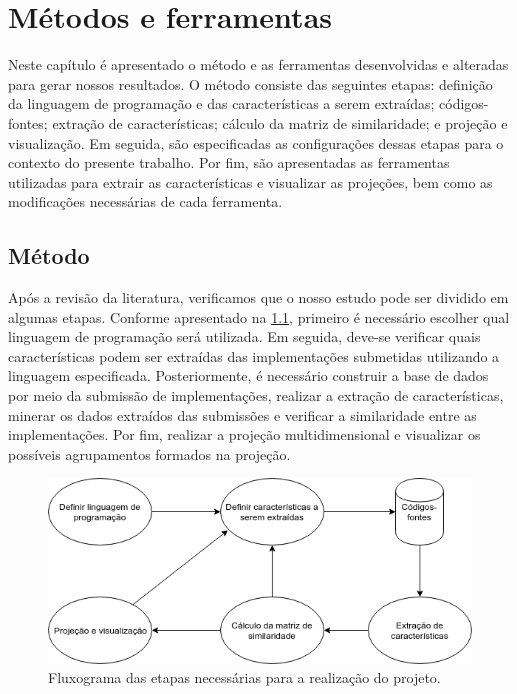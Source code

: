 \chapter{Métodos e ferramentas}
\label{chap:metodos-ferramentas}

	Neste capítulo é apresentado o método e as ferramentas desenvolvidas e alteradas para
	gerar nossos resultados. O método consiste das seguintes etapas:
	definição da linguagem de programação e das características a serem extraídas;
	códigos-fontes; extração de características; cálculo da matriz de similaridade;
	e projeção e visualização. Em seguida, são especificadas as configurações dessas etapas
	para o contexto do presente trabalho. Por fim, são apresentadas as ferramentas utilizadas para
	extrair as características e visualizar as projeções, bem como as modificações
	necessárias de cada ferramenta.

 	\section{Método}
 	\label{sec:metodo}
 	
	 	Após a revisão da literatura, verificamos que o nosso estudo pode ser dividido
	 	em algumas etapas. Conforme apresentado na \cref{fig:fluxogramaProposta}, primeiro é necessário
	 	escolher qual linguagem de programação será utilizada. Em seguida, deve-se verificar
	 	quais características podem ser extraídas das implementações submetidas utilizando a
	 	linguagem especificada. Posteriormente, é necessário construir a base de dados por
	 	meio da submissão de implementações, realizar a extração de características, minerar
	 	os dados extraídos das submissões e verificar a similaridade entre as implementações.
	 	Por fim, realizar a projeção multidimensional e visualizar os possíveis agrupamentos
	 	formados na projeção.
	 	
	 	\begin{figure}[ht]
	 		\centering
	 		\includegraphics[width=0.75\linewidth]{imagem/fluxogramaProposta}
	 		\caption{Fluxograma das etapas necessárias para a realização do projeto.}
	 		\label{fig:fluxogramaProposta}
	 	\end{figure}
	 	
